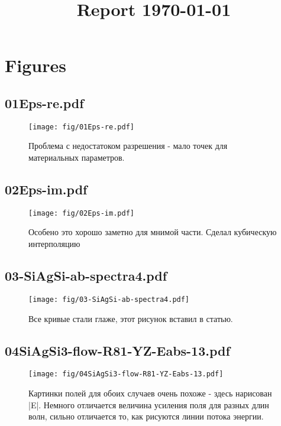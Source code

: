 \documentclass[fullscreen=true]{beamer}
\begin{document}
\title{Report \today}
\section{Figures}

\subsection{01Eps-re.pdf}
\begin{frame}
  \begin{figure}
    \texttt{[image: fig/01Eps-re.pdf]}%
    \caption{Проблема с недостатоком разрешения - мало точек для
      материальных параметров.}
  \end{figure}
\end{frame}

\subsection{02Eps-im.pdf}
\begin{frame}
  \begin{figure}
    \texttt{[image: fig/02Eps-im.pdf]}%
    \caption{Особено это хорошо заметно для мнимой части. Сделал
      кубическую интерполяцию}
  \end{figure}
\end{frame}

\subsection{03-SiAgSi-ab-spectra4.pdf}
\begin{frame}
  \begin{figure}
    \texttt{[image: fig/03-SiAgSi-ab-spectra4.pdf]}%
    \caption{Все кривые стали глаже, этот рисунок вставил в статью.}
  \end{figure}
\end{frame}

\subsection{04SiAgSi3-flow-R81-YZ-Eabs-13.pdf}
\begin{frame}
  \begin{figure}
    \texttt{[image: fig/04SiAgSi3-flow-R81-YZ-Eabs-13.pdf]}%
    \caption{Картинки полей для
      обоих случаев очень похоже - здесь нарисован |E|. Немного
      отличается величина усиления поля для разных длин волн, сильно
      отличается то, как рисуются линии потока энергии.}
  \end{figure}
\end{frame}
\end{document}

